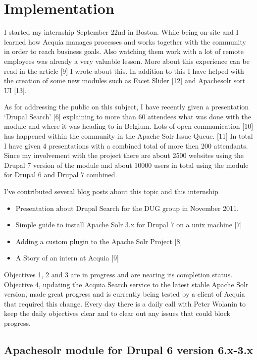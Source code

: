 \chapter{Implementation}

I started my internship September 22nd in Boston. While being on-site and I learned how Acquia manages processes and works together with the community in order to reach business goals. Also watching them work with a lot of remote employees was already a very valuable lesson. More about this experience can be read in the article [9] I wrote about this. In addition to this I have helped with the creation of some new modules such as Facet Slider [12] and Apachesolr sort UI [13].

As for addressing the public on this subject, I have recently given a presentation ‘Drupal Search’ [6] explaining to more than 60 attendees what was done with the module and where it was heading to in Belgium. Lots of open communication [10] has happened within the community in the Apache Solr Issue Queue. [11] In total I have given 4 presentations with a combined total of more then 200 attendants. Since my involvement with the project there are about 2500 websites using the Drupal 7 version of the module and about 10000 users in total using the module for Drupal 6 and Drupal 7 combined.
  
I’ve contributed several blog posts about this topic and this internship
\begin{itemize}
  \item Presentation about Drupal Search for the DUG group in November 2011. \cite{url10}
  \item Simple guide to install Apache Solr 3.x for Drupal 7 on a unix machine [7]
  \item Adding a custom plugin to the Apache Solr Project [8] 
  \item A Story of an intern at Acquia [9] 
\end{itemize}

Objectives 1, 2 and 3 are in progress and are nearing its completion status. Objective 4, updating the Acquia Search service to the latest stable Apache Solr version, made great progress and is currently being tested by a client of Acquia that required this change. 
Every day there is a daily call with Peter Wolanin to keep the daily objectives clear and to clear out any issues that could block progress.

\section{Apachesolr module for Drupal 6 version 6.x-3.x}

